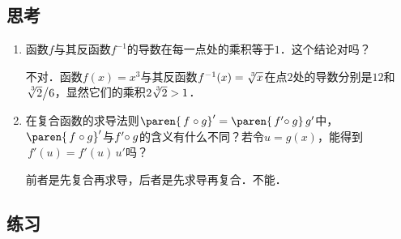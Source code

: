 \subsection*{思考}

\begin{enumerate}
\item 函数\(f\)与其反函数\(f^{-1}\)的导数在每一点处的乘积等于\(1\)．这个结论对吗？

  \ifshowsolp
    不对．函数\(f(x) = x^3\!\)与其反函数\(f^{-1}(x) = \sqrt[\leftroot{-2}\uproot{2}3]x\)在点\(2\)处的导数分别是\(12\)和\(\sqrt[\leftroot{-2}\uproot{2}3]{2}\big/{6}\)，显然它们的乘积\(2\sqrt[\leftroot{-2}\uproot{2}3]2 > 1\)．
  \fi

\item 在复合函数的求导法则\(\paren{\,f\mkern1mu \circ g}' = \paren{\,f'\mkern-4mu \circ g}\,g'\)中，\(\paren{\,f\mkern1mu \circ g}'\)与\(f'\mkern-4mu \circ g\)的含义有什么不同？若令\(u = g(x)\)，能得到\(\,f'(u) = f'(u)\,u'\)吗？

  \ifshowsolp
    前者是先复合再求导，后者是先求导再复合．不能．
  \fi
\end{enumerate}

\ifshowex
{}
\subsection*{练习}

